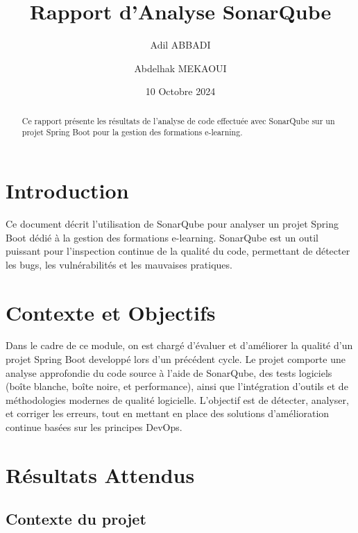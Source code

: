 \documentclass{article}
\title{Rapport d'Analyse SonarQube}
\author{Adil ABBADI \and Abdelhak MEKAOUI}
\date{10 Octobre 2024}
\begin{document}
\maketitle

\newpage

\begin{abstract}
    Ce rapport présente les résultats de l'analyse de code effectuée avec SonarQube sur un projet Spring Boot pour la gestion des formations e-learning.
    \end{abstract}


\tableofcontents
\newpage


\section{Introduction}

Ce document décrit l'utilisation de SonarQube pour analyser un projet Spring Boot dédié à la gestion des formations e-learning. SonarQube est un outil puissant pour l'inspection continue de la qualité du code, permettant de détecter les bugs, les vulnérabilités et les mauvaises pratiques.

\section{Contexte et Objectifs}

Dans le cadre de ce module, on est chargé d’évaluer et d’améliorer la qualité d’un projet Spring Boot developpé lors d’un précédent cycle. Le projet comporte une analyse approfondie du code source à l'aide de SonarQube, des tests logiciels (boîte blanche, boîte noire, et performance), ainsi que l’intégration d’outils et de méthodologies modernes de qualité logicielle. L’objectif est de détecter, analyser, et corriger les erreurs, tout en mettant en place des solutions d’amélioration continue basées sur les principes DevOps.

\section{Résultats Attendus}

\subsection{Contexte du projet}
\end{document}
